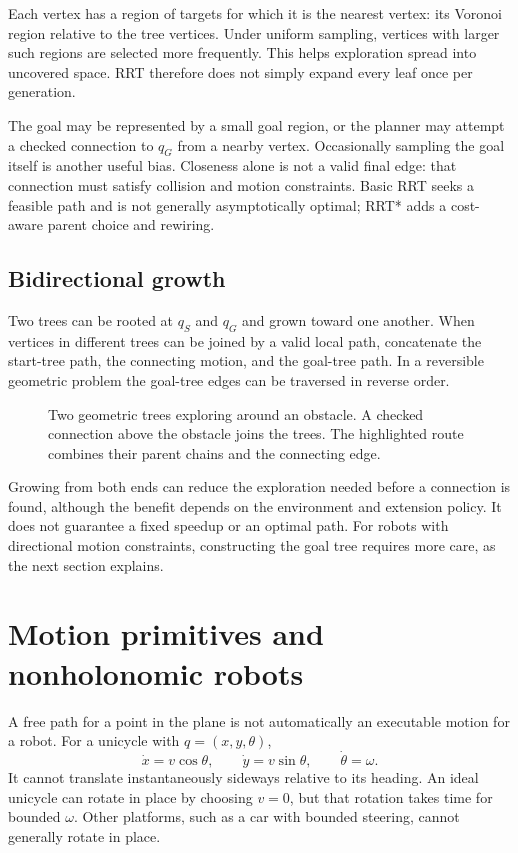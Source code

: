 Each vertex has a region of targets for which it is the nearest vertex:
its Voronoi region relative to the tree vertices. Under uniform sampling,
vertices with larger such regions are selected more frequently. This
helps exploration spread into uncovered space. RRT therefore does not
simply expand every leaf once per generation.

The goal may be represented by a small goal region, or the planner may
attempt a checked connection to $q_G$ from a nearby vertex. Occasionally
sampling the goal itself is another useful bias. Closeness alone is not
a valid final edge: that connection must satisfy collision and motion
constraints. Basic RRT seeks a feasible path and is not generally
asymptotically optimal; RRT* adds a cost-aware parent choice and rewiring.

\subsection{Bidirectional growth}
Two trees can be rooted at $q_S$ and $q_G$ and grown toward one another.
When vertices in different trees can be joined by a valid local path,
concatenate the start-tree path, the connecting motion, and the goal-tree
path. In a reversible geometric problem the goal-tree edges can be
traversed in reverse order.

\begin{figure}[htbp]
\centering
\caption{Two geometric trees exploring around an obstacle. A checked
connection above the obstacle joins the trees. The highlighted route
combines their parent chains and the connecting edge.}
\label{fig:l13-bidirectional}
\end{figure}

Growing from both ends can reduce the exploration needed before a
connection is found, although the benefit depends on the environment and
extension policy. It does not guarantee a fixed speedup or an optimal path.
For robots with directional motion constraints, constructing the goal
tree requires more care, as the next section explains.

\section{Motion primitives and nonholonomic robots}
\label{sec:l13-primitives}
A free path for a point in the plane is not automatically an executable
motion for a robot. For a unicycle with $q=(x,y,\theta)$,
\[
 \dot{x}=v\cos\theta,\qquad
 \dot{y}=v\sin\theta,\qquad
 \dot{\theta}=\omega.
\]
It cannot translate instantaneously sideways relative to its heading.
An ideal unicycle can rotate in place by choosing $v=0$, but that rotation
takes time for bounded $\omega$. Other platforms, such as a car with
bounded steering, cannot generally rotate in place.

